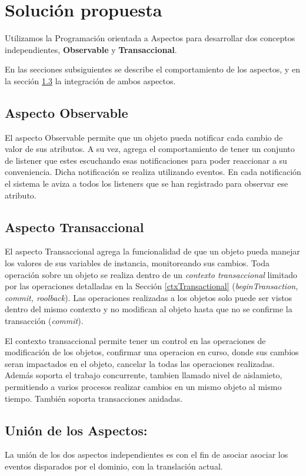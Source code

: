 \section{Solución propuesta}
\label{sec:Solucion}

Utilizamos la Programación orientada a Aspectos para desarrollar dos
conceptos independientes, {\bf Observable} y  {\bf Transaccional}.

En las secciones subsiguientes se describe el comportamiento de los aspectos, y
en la sección \ref{sec:Union} la integración de ambos aspectos.

\subsection{Aspecto Observable}
	El aspecto Observable permite que un objeto pueda notificar cada cambio de
	valor de sus atributos. A su vez, agrega el comportamiento de tener un conjunto
	de listener que estes escuchando esas notificaciones para poder reaccionar a su
	conveniencia.
	Dicha notificación se realiza utilizando eventos. En cada notificación el
	sistema le aviza a todos los listeners que se han registrado para observar ese
	atributo.

\subsection{Aspecto Transaccional}
	El aspecto Transaccional agrega  la funcionalidad de que un objeto pueda
	manejar los valores de sus variables de instancia, monitoreando sus cambios.	
	Toda operación sobre un objeto se realiza dentro de un \emph{contexto
	transaccional} limitado por las operaciones detalladas en la Sección
	\ref{ctxTransactional} (\emph{beginTransaction, commit, roolback}).
	Las operaciones realizadas a los objetos solo puede ser
	vistos dentro del mismo contexto y no modifican al objeto hasta que no se
	confirme la transacción (\emph{commit}).
	 
	El contexto transaccional permite tener un control en las operaciones de
	modificación de los objetos, confirmar una operacion en curso, donde sus
	cambios seran impactados en el objeto, cancelar la todas las operaciones
	realizadas. Además soporta el trabajo concurrente, tambien llamado
	nivel de aislamieto, permitiendo a varios procesos realizar cambios en un
	mismo objeto al mismo tiempo. También soporta transacciones
	anidadas.
	
	
\subsection{Unión de los Aspectos:}
\label{sec:Union}
La unión de los dos aspectos independientes es con el fin de asociar asociar los
eventos disparados por el dominio, con la translación actual.
 
